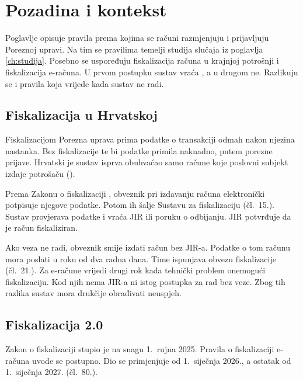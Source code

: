 \section{Pozadina i kontekst}
\label{ch:pozadina}

Poglavlje opisuje pravila prema kojima se računi razmjenjuju i prijavljuju
Poreznoj upravi. Na tim se pravilima temelji studija slučaja iz
poglavlja \ref{ch:studija}. Posebno se uspoređuju fiskalizacija računa u
krajnjoj potrošnji i fiskalizacija e-računa. U prvom postupku sustav vraća
, a u drugom ne. Razlikuju
se i pravila koja vrijede kada sustav ne radi.

\subsection{Fiskalizacija u Hrvatskoj}
\label{sec:fiskalizacija-hr}

Fiskalizacijom Porezna uprava prima podatke o transakciji odmah nakon
njezina nastanka. Bez fiskalizacije te bi podatke primila naknadno, putem
porezne prijave. Hrvatski je sustav isprva obuhvaćao samo račune koje
poslovni subjekt izdaje potrošaču
().

Prema Zakonu o fiskalizaciji \cite{nn2025zakonfiskalizacija}, obveznik pri
izdavanju računa elektronički potpisuje njegove podatke. Potom ih šalje
Sustavu za fiskalizaciju (čl.~15.). Sustav provjerava podatke i vraća
JIR ili poruku o odbijanju. JIR potvrđuje da je račun fiskaliziran.

Ako veza ne radi, obveznik smije izdati račun bez JIR-a. Podatke o tom računu
mora poslati u roku od dva radna dana. Time ispunjava obvezu fiskalizacije
(čl.~21.). Za e-račune vrijedi drugi rok kada tehnički problem onemogući
fiskalizaciju. Kod njih nema JIR-a ni istog postupka za rad bez veze. Zbog tih
razlika sustav mora drukčije obrađivati neuspjeh.

\subsection{Fiskalizacija 2.0}
\label{sec:fiskalizacija-2-0}

Zakon o fiskalizaciji stupio je na snagu 1.~rujna 2025. Pravila o
fiskalizaciji e-računa uvode se postupno. Dio se primjenjuje od
1.~siječnja 2026., a ostatak od 1.~siječnja 2027. (čl.~80.).

